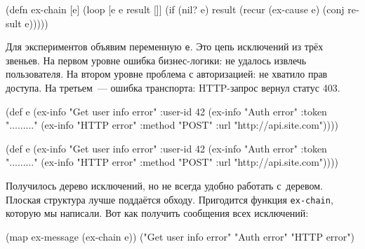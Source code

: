 \else

\begin{english}
  \begin{clojure}
(defn ex-chain [e]
  (loop [e e
         result []]
    (if (nil? e)
      result
      (recur (ex-cause e) (conj result e)))))
  \end{clojure}
\end{english}

\fi

Для экспериментов объявим переменную \verb|e|. Это цепь исключений из трёх
звеньев. На первом уровне ошибка бизнес-логики: не удалось извлечь
пользователя. На втором уровне проблема с авторизацией: не хватило прав
доступа. На третьем~--- ошибка транспорта: HTTP-запрос вернул статус 403.

\label{e-sample}

\ifx\DEVICETYPE\MOBILE

\begin{english}
  \begin{clojure}
(def e
  (ex-info
   "Get user info error"
   {:user-id 42}
   (ex-info
     "Auth error"
     {:token "........."}
     (ex-info
       "HTTP error"
       {:method "POST"
        :url "http://api.site.com"}))))
  \end{clojure}
\end{english}

\else

\begin{english}
  \begin{clojure}
(def e
  (ex-info
   "Get user info error"
   {:user-id 42}
   (ex-info "Auth error"
            {:token "........."}
            (ex-info "HTTP error"
                     {:method "POST"
                      :url "http://api.site.com"}))))
  \end{clojure}
\end{english}

\fi


Получилось дерево исключений, но не всегда удобно работать с~деревом. Плоская
структура лучше поддаётся обходу. Пригодится функция \verb|ex-chain|, которую
мы написали. Вот как получить сообщения всех исключений:

\ifx\DEVICETYPE\MOBILE

\begin{english}
  \begin{clojure}
(map ex-message (ex-chain e))
("Get user info error"
 "Auth error" "HTTP error")
  \end{clojure}
\end{english}

